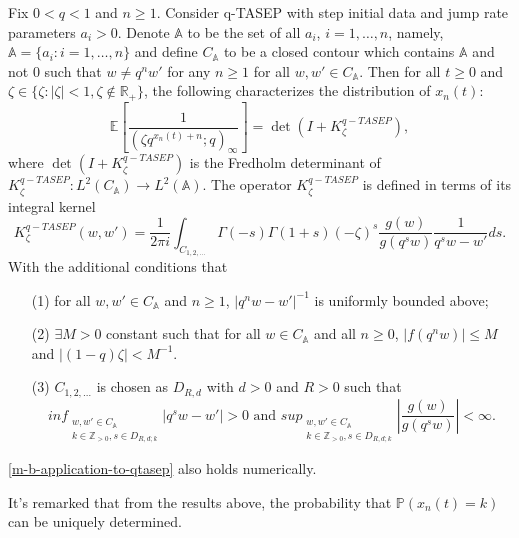 \begin{theorem}
\label{mbmb-application-to-qtasep}
Fix $0 < q < 1$ and $n \ge 1$. Consider q-TASEP with step initial data and jump rate parameters $a_i > 0$. Denote $\mathbb{A}$ to be the set of all $a_i$, $i = 1, \dots, n$, namely, $\mathbb{A} = \{a_i: i = 1, \dots, n\}$ and define $C_{\mathbb{A}}$ to be a closed contour which contains $\mathbb{A}$ and not $0$ such that $w \neq q^n w'$ for any $n \ge 1$ for all $w, w' \in C_{\mathbb{A}}$. Then for all $t \ge 0$ and $\zeta \in \{\zeta: |\zeta| < 1, \zeta \notin \mathbb{R}_+\}$, the following characterizes the distribution of $x_n(t)$:
\begin{equation}
\label{m-b-application-to-qtasep}
\mathbb{E} \left[ \frac{1}{(\zeta q^{x_n(t)+n}; q)_{\infty}} \right] = \det(I+K_{\zeta}^{q-TASEP}),
\end{equation}
where $\det(I+K_{\zeta}^{q-TASEP})$ is the Fredholm determinant of $K_{\zeta}^{q-TASEP}: L^2(C_{\mathbb{A}}) \rightarrow L^2(\mathbb{A})$. The operator $K_{\zeta}^{q-TASEP}$ is defined in terms of its integral kernel
$$K_{\zeta}^{q-TASEP}(w,w') = \frac{1}{2 \pi i} \int_{C_{1,2,\dots}} \Gamma(-s) \Gamma(1+s) (-\zeta)^s \frac{g(w)}{g(q^sw)} \frac{1}{q^sw - w'} ds.$$
With the additional conditions that
\begin{enumerate}
\item[(1)] for all $w, w' \in C_{\mathbb{A}}$ and $n \ge 1$, $|q^n w - w'|^{-1}$ is uniformly bounded above;
\item[(2)] $\exists M > 0$ constant such that for all $w \in C_{\mathbb{A}}$ and all $n \ge 0$, $|f(q^n w)| \le M$ and $|(1-q) \zeta| < M^{-1}$.
\item[(3)] $C_{1,2,\dots}$ is chosen as $D_{R,d}$ with $d > 0$ and $R > 0$ such that $$ inf_{\substack{ {w, w' \in C_{\mathbb{A}}} \\ {k \in \mathbb{Z}_{>0}, s \in D_{R, d;k}} }} |q^sw - w'| > 0 \text{ and } sup_{\substack{ {w,w' \in C_{\mathbb{A}}} \\ {k \in \mathbb{Z}_{>0}, s \in D_{R,d;k}} }} \left| \frac{g(w)}{g(q^s w)} \right| < \infty.$$
\end{enumerate}
\eqref{m-b-application-to-qtasep} also holds numerically.
\end{theorem}

\begin{remark}
It's remarked that from the results above, the probability that $\mathbb{P}(x_n(t) = k)$ can be uniquely determined.
\end{remark}

